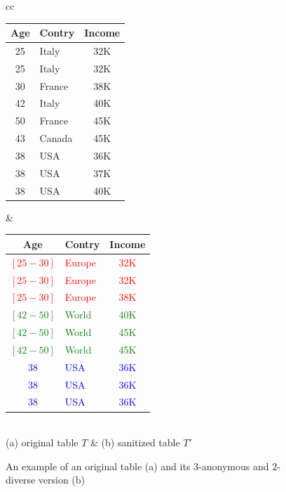 \documentclass[conference]{IEEEtran}
\begin{document}
\begin{figure}[!t]
	\begin{scriptsize}
		\begin{center}
			\begin{tabular}{cc}
				\begin{tabular}{|c|l|c|}
					\hline
					{\bf Age} & {\bf Contry} & {\bf Income}\\
					\hline
					25 & Italy & 32K\\
					25 & Italy & 32K\\
					30 & France & 38K\\
					42 & Italy  & 40K\\
					50 & France & 45K\\
					43 & Canada & 45K\\
					38 & USA & 36K\\
					38 & USA & 37K\\
					38 & USA & 40K\\
					\hline
				\end{tabular}
				&
				\begin{tabular}{|c|l|c|}
					\hline
					{\bf Age} & {\bf Contry} & {\bf Income}\\
					\hline
					\textcolor{red}{$[25-30]$} & \textcolor{red}{Europe} & \textcolor{red}{32K}\\
					\textcolor{red}{$[25-30]$} & \textcolor{red}{Europe} & \textcolor{red}{32K}\\
					\textcolor{red}{$[25-30]$} & \textcolor{red}{Europe} & \textcolor{red}{38K}\\
					\hline
					\textcolor{green}{$[42-50]$} & \textcolor{green}{World}  & \textcolor{green}{40K}\\
					\textcolor{green}{$[42-50]$} & \textcolor{green}{World} & \textcolor{green}{45K}\\
					\textcolor{green}{$[42-50]$} & \textcolor{green}{World} & \textcolor{green}{45K}\\
					\hline
					\textcolor{blue}{38} & \textcolor{blue}{USA} & \textcolor{blue}{36K}\\
					\textcolor{blue}{38} & \textcolor{blue}{USA} & \textcolor{blue}{36K}\\
					\textcolor{blue}{38} & \textcolor{blue}{USA} & \textcolor{blue}{36K}\\
					\hline
				\end{tabular} 
				\\
				(a) original table $T$ & (b) sanitized table $T'$\\           
			\end{tabular}
		\end{center}
	\end{scriptsize}
	\caption{\label{fig:tables}An example of an original table (a) and its $3$-anonymous and $2$-diverse version (b)}
\end{figure}
\end{document}
